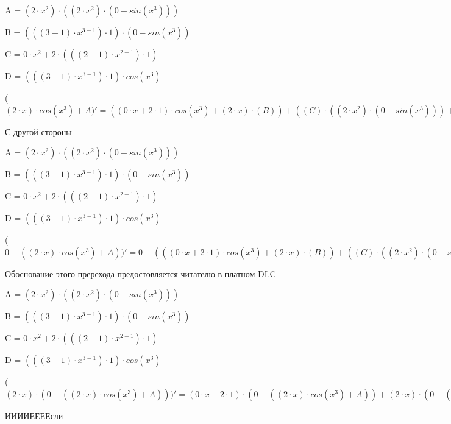 \documentclass[12pt,a4paper,fleqn]{article}
\begin{document}
\begin{center}
A = $(2 \cdot x^{2}) \cdot ((2 \cdot x^{2}) \cdot (0-sin(x^{3})))$\end{center}
\begin{center}
B = $(((3-1) \cdot x^{3-1}) \cdot 1) \cdot (0-sin(x^{3}))$\end{center}
\begin{center}
C = $0 \cdot x^{2}+2 \cdot (((2-1) \cdot x^{2-1}) \cdot 1)$\end{center}
\begin{center}
D = $(((3-1) \cdot x^{3-1}) \cdot 1) \cdot cos(x^{3})$\end{center}
\begin{center}
 ($(2 \cdot x) \cdot cos(x^{3})+A)'
  = ((0 \cdot x+2 \cdot 1) \cdot cos(x^{3})+(2 \cdot x) \cdot (B))+((C) \cdot ((2 \cdot x^{2}) \cdot (0-sin(x^{3})))+(2 \cdot x^{2}) \cdot ((C) \cdot (0-sin(x^{3}))+(2 \cdot x^{2}) \cdot (0-D)))$\end{center}
С другой стороны

\begin{center}
A = $(2 \cdot x^{2}) \cdot ((2 \cdot x^{2}) \cdot (0-sin(x^{3})))$\end{center}
\begin{center}
B = $(((3-1) \cdot x^{3-1}) \cdot 1) \cdot (0-sin(x^{3}))$\end{center}
\begin{center}
C = $0 \cdot x^{2}+2 \cdot (((2-1) \cdot x^{2-1}) \cdot 1)$\end{center}
\begin{center}
D = $(((3-1) \cdot x^{3-1}) \cdot 1) \cdot cos(x^{3})$\end{center}
\begin{center}
 ($0-((2 \cdot x) \cdot cos(x^{3})+A))'
  = 0-(((0 \cdot x+2 \cdot 1) \cdot cos(x^{3})+(2 \cdot x) \cdot (B))+((C) \cdot ((2 \cdot x^{2}) \cdot (0-sin(x^{3})))+(2 \cdot x^{2}) \cdot ((C) \cdot (0-sin(x^{3}))+(2 \cdot x^{2}) \cdot (0-D))))$\end{center}
Обоснование этого пререхода предостовляется читателю в платном DLC

\begin{center}
A = $(2 \cdot x^{2}) \cdot ((2 \cdot x^{2}) \cdot (0-sin(x^{3})))$\end{center}
\begin{center}
B = $(((3-1) \cdot x^{3-1}) \cdot 1) \cdot (0-sin(x^{3}))$\end{center}
\begin{center}
C = $0 \cdot x^{2}+2 \cdot (((2-1) \cdot x^{2-1}) \cdot 1)$\end{center}
\begin{center}
D = $(((3-1) \cdot x^{3-1}) \cdot 1) \cdot cos(x^{3})$\end{center}
\begin{center}
 ($(2 \cdot x) \cdot (0-((2 \cdot x) \cdot cos(x^{3})+A)))'
  = (0 \cdot x+2 \cdot 1) \cdot (0-((2 \cdot x) \cdot cos(x^{3})+A))+(2 \cdot x) \cdot (0-(((0 \cdot x+2 \cdot 1) \cdot cos(x^{3})+(2 \cdot x) \cdot (B))+((C) \cdot ((2 \cdot x^{2}) \cdot (0-sin(x^{3})))+(2 \cdot x^{2}) \cdot ((C) \cdot (0-sin(x^{3}))+(2 \cdot x^{2}) \cdot (0-D)))))$\end{center}
ИИИИЕЕЕЕсли\cite{link3}
\end{document}
